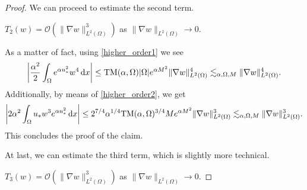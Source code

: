 \documentclass[reqno,11pt]{amsart}
\theoremstyle{definition}
\newcommand{\ud}{\,\mathrm{d}}
\begin{document}
\begin{proof}
    We can proceed to estimate the second term. 
    
     $T_2(w)=\mathcal{O}(\|\nabla w\|^3_{L^2(\Omega)})$ as $\|\nabla w\|_{L^2(\Omega)}\to0$.

    \noindent
    As a matter of fact, using \eqref{higher_order1} we see 
    \begin{equation} \label{higher_order8} 
    \left | \frac{\alpha^2}{2} \int_\Omega e^{\alpha u_*^2} w^4 \ud x \right | \leq 
    {\rm TM}(\alpha,\Omega) |\Omega |e^{\alpha M^2} \| \nabla w \|_{L^2(\Omega)}^4 \lesssim_{\alpha, \Omega, M}\| \nabla w\|_{L^2(\Omega)}^4.\end{equation} 
    Additionally, by means of \eqref{higher_order2}, we get
    \begin{equation} \label{higher_order9} 
    \left | 2\alpha^2 \int_\Omega u_*w^3 e^{\alpha u_*^2} \ud x \right | \leq 
    2^{7/4} \alpha ^{1/4} {\rm TM}(\alpha,\Omega)^{3/4} M e^{\alpha M^2} 
    \| \nabla w\|_{L^2(\Omega)}^3\lesssim_{\alpha, \Omega, M}\| \nabla w\|_{L^2(\Omega)}^3.\end{equation}
    This concludes the proof of the claim. 


    At last, we can estimate the third term, which is slightly more technical.
    
     $T_3(w)=\mathcal{O}(\|\nabla w\|^3_{L^2(\Omega)})$ as $\|\nabla w\|_{L^2(\Omega)}\to0$.


\end{proof}
\end{document}
